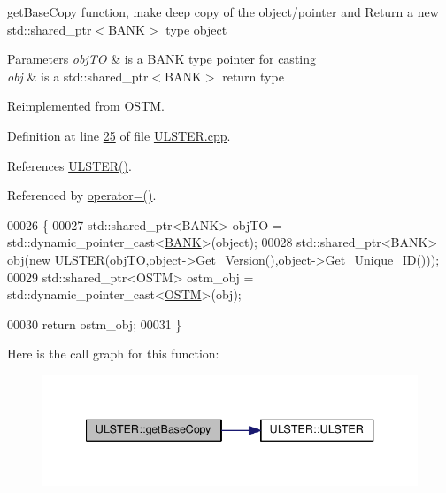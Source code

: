get\+Base\+Copy function, make deep copy of the object/pointer and Return a new std\+::shared\+\_\+ptr$<$\+B\+A\+N\+K$>$ type object 


\begin{DoxyParams}{Parameters}
{\em obj\+TO} & is a \hyperlink{class_b_a_n_k}{B\+A\+NK} type pointer for casting \\
\hline
{\em obj} & is a std\+::shared\+\_\+ptr$<$\+B\+A\+N\+K$>$ return type \\
\hline
\end{DoxyParams}


Reimplemented from \hyperlink{class_o_s_t_m_a0bfa3763bd441407dd6365f42714f94c_a0bfa3763bd441407dd6365f42714f94c}{O\+S\+TM}.



Definition at line \hyperlink{_u_l_s_t_e_r_8cpp_source_l00025}{25} of file \hyperlink{_u_l_s_t_e_r_8cpp_source}{U\+L\+S\+T\+E\+R.\+cpp}.



References \hyperlink{_u_l_s_t_e_r_8h_source_l00024}{U\+L\+S\+T\+E\+R()}.



Referenced by \hyperlink{_u_l_s_t_e_r_8h_source_l00062}{operator=()}.


\begin{DoxyCode}
00026 \{
00027     std::shared\_ptr<BANK> objTO = std::dynamic\_pointer\_cast<\hyperlink{class_b_a_n_k}{BANK}>(object);
00028     std::shared\_ptr<BANK> obj(\textcolor{keyword}{new} \hyperlink{class_u_l_s_t_e_r_a637ad8cb5537167ab51cd079637a8323_a637ad8cb5537167ab51cd079637a8323}{ULSTER}(objTO,object->Get\_Version(),\textcolor{keywordtype}{object}->Get\_Unique\_ID())); 
00029     std::shared\_ptr<OSTM> ostm\_obj = std::dynamic\_pointer\_cast<\hyperlink{class_o_s_t_m}{OSTM}>(obj);                             
           
00030     \textcolor{keywordflow}{return} ostm\_obj;
00031 \}
\end{DoxyCode}


Here is the call graph for this function\+:\nopagebreak
\begin{figure}[H]
\begin{center}
\leavevmode
\includegraphics[width=340pt]{class_u_l_s_t_e_r_ad0c05e562b0c67283edfa4940c9aa728_ad0c05e562b0c67283edfa4940c9aa728_cgraph}
\end{center}
\end{figure}



